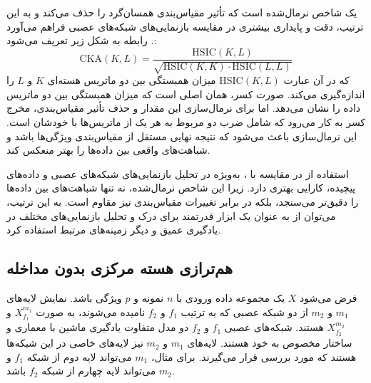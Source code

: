 یک شاخص نرمال‌شده است که تأثیر مقیاس‌بندی همسان‌گرد را حذف می‌کند و به این ترتیب، دقت و پایداری بیشتری در مقایسه بازنمایی‌های شبکه‌های عصبی فراهم می‌آورد
\cite{cortes2012algorithms, cristianini2001kernel}.
رابطه
به شکل زیر تعریف می‌شود:
\begin{equation}
	\text{CKA}(K, L) = \frac{\text{HSIC}(K, L)}{\sqrt{\text{HSIC}(K, K) \cdot \text{HSIC}(L, L)}}
	\label{eq_CKA}
\end{equation}
که در آن عبارت \(\text{HSIC}(K, L)\) میزان همبستگی بین دو ماتریس هسته‌ای \(K\) و \(L\) را اندازه‌گیری می‌کند. صورت کسر، همان
اصلی است که میزان همبستگی بین دو ماتریس داده را نشان می‌دهد. اما برای نرمال‌سازی این مقدار و حذف تأثیر مقیاس‌بندی، مخرج کسر به کار می‌رود که شامل ضرب دو
مربوط به هر یک از ماتریس‌ها با خودشان است. این نرمال‌سازی باعث می‌شود که نتیجه نهایی مستقل از مقیاس‌بندی ویژگی‌ها باشد و شباهت‌های واقعی بین داده‌ها را بهتر منعکس کند.

استفاده از
در مقایسه با
%
، به‌ویژه در تحلیل بازنمایی‌های شبکه‌های عصبی و داده‌های پیچیده، کارایی بهتری دارد. زیرا این شاخص نرمال‌شده، نه تنها شباهت‌های بین داده‌ها را دقیق‌تر می‌سنجد، بلکه در برابر تغییرات مقیاس‌بندی نیز مقاوم است. به این ترتیب، می‌توان از
به عنوان یک ابزار قدرتمند برای درک و تحلیل بازنمایی‌های مختلف در یادگیری عمیق و دیگر زمینه‌های مرتبط استفاده کرد.




\subsection{
	هم‌ترازی هسته مرکزی بدون مداخله%
}
فرض می‌شود \(X\) یک مجموعه داده ورودی با \(n\) نمونه و \(p\) ویژگی باشد. نمایش‌ لایه‌های \(m_1\) و \(m_2\) از دو شبکه عصبی که به ترتیب \(f_1\) و \(f_2\) نامیده می‌شوند، به صورت \(X^{m_1}_{f_1}\) و \(X^{m_2}_{f_2}\) هستند. شبکه‌های عصبی \(f_1\) و \(f_2\) دو مدل متفاوت یادگیری ماشین با معماری و ساختار مخصوص به خود هستند. لایه‌های \(m_1\) و \(m_2\) نیز لایه‌های خاصی در این شبکه‌ها هستند که مورد بررسی قرار می‌گیرند. برای مثال، \(m_1\) می‌تواند لایه دوم از شبکه \(f_1\) و \(m_2\) می‌تواند لایه چهارم از شبکه \(f_2\) باشد.

